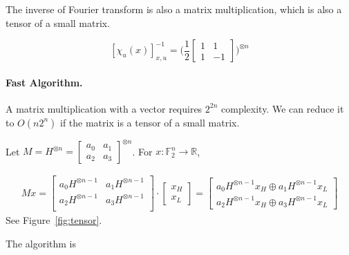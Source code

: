 \documentclass[12pt,journal=tosc, notanonymous]{iacrtrans}
\begin{document}
The inverse of Fourier transform is also a matrix multiplication, which is also a tensor of a small matrix.

$$
[\chi_u(x)]_{x, u}^{-1} = 
\Big(
\frac{1}{2}\begin{bmatrix}
1 & 1 \\
1 & -1
\end{bmatrix}
\Big)
^{\otimes n}
$$

\paragraph{Fast Algorithm.}

A matrix multiplication with a vector requires $2^{2n}$ complexity. We can reduce it to $O(n2^n)$
if the matrix is a tensor of a small matrix.

Let $M = H^{\otimes n} = \begin{bmatrix} a_0 & a_1 \\ a_2 & a_3 \end{bmatrix}^{\otimes n}$.
For $x: \mathbb{F}_2^n \rightarrow \mathbb{R}$,

$$
\begin{aligned}
M x = 
\begin{bmatrix}
a_0 H^{\otimes n-1} & a_1 H^{\otimes n-1} \\ 
a_2 H^{\otimes n-1} & a_3 H^{\otimes n-1} \\ 
\end{bmatrix}
\cdot 
\begin{bmatrix}
x_H\\
x_L
\end{bmatrix} 
= 
\begin{bmatrix}
a_0 H^{\otimes n-1}  x_H \oplus a_1 H^{\otimes n-1} x_L \\ 
a_2 H^{\otimes n-1}  x_H \oplus a_3 H^{\otimes n-1} x_L 
\end{bmatrix}
\end{aligned}
$$
See Figure~\ref{fig:tensor}.

The algorithm is 


\end{document}
